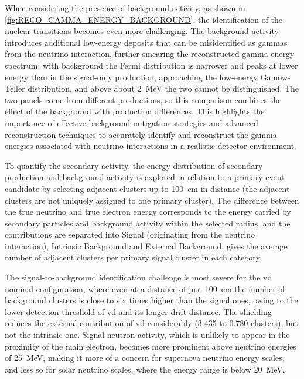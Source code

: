 When considering the presence of background activity, as shown in \cref{fig:RECO_GAMMA_ENERGY_BACKGROUND}, the identification of the nuclear transitions becomes even more challenging. The background activity introduces additional low-energy deposits that can be misidentified as gammas from the neutrino interaction, further smearing the reconstructed gamma energy spectrum: with background the Fermi distribution is narrower and peaks at lower energy than in the signal-only production, approaching the low-energy Gamow-Teller distribution, and above about \SI{2}{\mega\electronvolt} the two cannot be distinguished. The two panels come from different productions, so this comparison combines the effect of the background with production differences. This highlights the importance of effective background mitigation strategies and advanced reconstruction techniques to accurately identify and reconstruct the gamma energies associated with neutrino interactions in a realistic detector environment.

To quantify the secondary activity, the energy distribution of secondary production and background activity is explored in relation to a primary event candidate by selecting adjacent clusters up to \SI{100}{\centi\meter} in distance (the adjacent clusters are not uniquely assigned to one primary cluster). The difference between the true neutrino and true electron energy corresponds to the energy carried by secondary particles and background activity within the selected radius, and the contributions are separated into Signal (originating from the neutrino interaction), Intrinsic Background and External Background.  gives the average number of adjacent clusters per primary signal cluster in each category.

\begin{table}[ht!]
    \centering
    
    \caption{Average number of adjacent clusters per primary signal cluster up to \SI{100}{\centi\meter} vertex distance in the neutrino energy range of \qtyrange{4}{30}{\mega\electronvolt}. The adjacent clusters are divided into signal (originating from the neutrino interaction), intrinsic and external (corresponding to the origin of the different background sources).\label{tab:ADJCLUSTERNUM_RADIAL_100}}
\end{table}

The signal-to-background identification challenge is most severe for the \gls{vd} nominal configuration, where even at a distance of just \SI{100}{\centi\meter} the number of background clusters is close to six times higher than the signal ones, owing to the lower detection threshold of \gls{vd} and its longer drift distance. The shielding reduces the external contribution of \gls{vd} considerably (\num{3.435} to \num{0.780} clusters), but not the intrinsic one. Signal neutron activity, which is unlikely to appear in the proximity of the main electron, becomes more prominent above neutrino energies of \SI{25}{\mega\electronvolt}, making it more of a concern for supernova neutrino energy scales, and less so for solar neutrino scales, where the energy range is below \SI{20}{\mega\electronvolt}.

